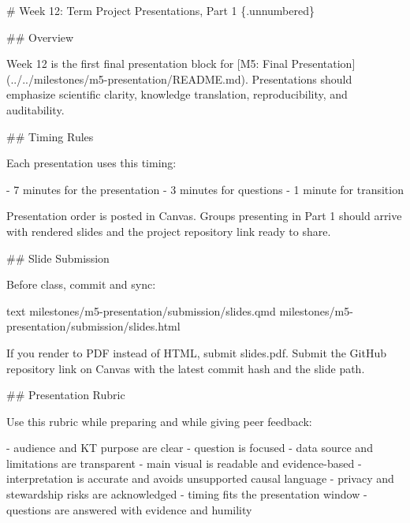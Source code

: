 \documentclass[
  letterpaper,
  DIV=11,
  numbers=noendperiod,
  oneside]{scrreprt}
\newenvironment{Shaded}{\begin{snugshade}}{\end{snugshade}}
\newcommand{\CommentTok}[1]{\textcolor[rgb]{0.37,0.37,0.37}{#1}}
\newcommand{\FunctionTok}[1]{\textcolor[rgb]{0.28,0.35,0.67}{#1}}
\newcommand{\InformationTok}[1]{\textcolor[rgb]{0.37,0.37,0.37}{#1}}
\newcommand{\NormalTok}[1]{\textcolor[rgb]{0.00,0.23,0.31}{#1}}
\newcommand{\OtherTok}[1]{\textcolor[rgb]{0.00,0.23,0.31}{#1}}
\newcommand{\SpecialStringTok}[1]{\textcolor[rgb]{0.13,0.47,0.30}{#1}}
\begin{document}
\begin{Shaded}
\begin{Highlighting}[numbers=left,,]
\FunctionTok{\# Week 12: Term Project Presentations, Part 1 \{.unnumbered\}}


\FunctionTok{\#\# Overview}

\NormalTok{Week 12 is the first final presentation block for }\CommentTok{[}\OtherTok{M5: Final Presentation}\CommentTok{](../../milestones/m5{-}presentation/README.md)}\NormalTok{. Presentations should emphasize scientific clarity, knowledge translation, reproducibility, and auditability.}

\FunctionTok{\#\# Timing Rules}

\NormalTok{Each presentation uses this timing:}

\SpecialStringTok{{-} }\NormalTok{7 minutes for the presentation}
\SpecialStringTok{{-} }\NormalTok{3 minutes for questions}
\SpecialStringTok{{-} }\NormalTok{1 minute for transition}

\NormalTok{Presentation order is posted in Canvas. Groups presenting in Part 1 should arrive with rendered slides and the project repository link ready to share.}

\FunctionTok{\#\# Slide Submission}

\NormalTok{Before class, commit and sync:}

\InformationTok{\textasciigrave{}\textasciigrave{}\textasciigrave{}text}
\InformationTok{milestones/m5{-}presentation/submission/slides.qmd}
\InformationTok{milestones/m5{-}presentation/submission/slides.html}
\InformationTok{\textasciigrave{}\textasciigrave{}\textasciigrave{}}

\NormalTok{If you render to PDF instead of HTML, submit }\InformationTok{\textasciigrave{}slides.pdf\textasciigrave{}}\NormalTok{. Submit the GitHub repository link on Canvas with the latest commit hash and the slide path.}

\FunctionTok{\#\# Presentation Rubric}

\NormalTok{Use this rubric while preparing and while giving peer feedback:}

\SpecialStringTok{{-} }\NormalTok{audience and KT purpose are clear}
\SpecialStringTok{{-} }\NormalTok{question is focused}
\SpecialStringTok{{-} }\NormalTok{data source and limitations are transparent}
\SpecialStringTok{{-} }\NormalTok{main visual is readable and evidence{-}based}
\SpecialStringTok{{-} }\NormalTok{interpretation is accurate and avoids unsupported causal language}
\SpecialStringTok{{-} }\NormalTok{privacy and stewardship risks are acknowledged}
\SpecialStringTok{{-} }\NormalTok{timing fits the presentation window}
\SpecialStringTok{{-} }\NormalTok{questions are answered with evidence and humility}


\end{Highlighting}
\end{Shaded}
\end{document}

